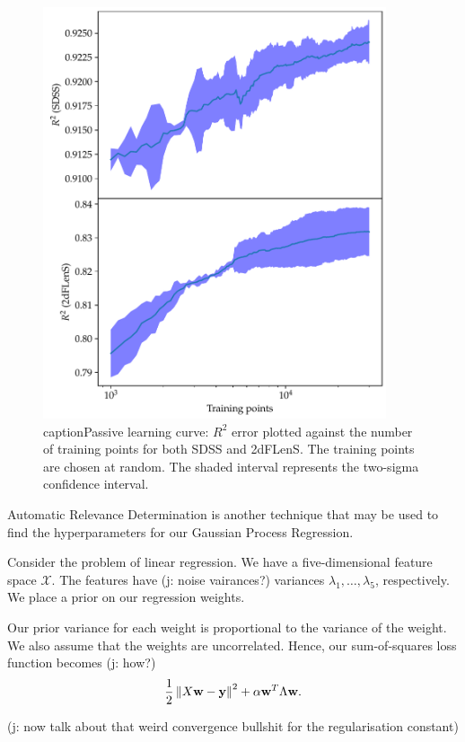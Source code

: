 \documentclass[11pt,twoside]{report}
\newcommand\bw{\mathbf{w}}
\newcommand\by{\mathbf{y}}
\newcommand\cX{\mathcal{X}}
\newcommand\norm[1]{\left\|#1\right\|}
\newcommand\jakub[1]{{\color{red}(j: #1)}}
\begin{document}
  \begin{figure}
    \centering
    \includegraphics[width=0.9\textwidth]{passive_r2.pdf}
    caption{Passive learning curve: $R^2$ error plotted against the number of training points for both SDSS and 2dFLenS. The training points are chosen at random. The shaded interval represents the two-sigma confidence interval.}
    \label{fig:passive_r2}
  \end{figure}

Automatic Relevance Determination is another technique that may be used to find the hyperparameters for our Gaussian Process Regression.

Consider the problem of linear regression. We have a five-dimensional feature space $\cX$. The features have \jakub{noise vairances?} variances $\lambda_1, \dots, \lambda_5$, respectively. We place a prior on our regression weights.

Our prior variance for each weight is proportional to the variance of the weight. We also assume that the weights are uncorrelated. Hence, our sum-of-squares loss function becomes \jakub{how?}\[
    \frac12\norm{X\bw - \by}^2 + \alpha \bw^T \Lambda \bw \text.
\]

\jakub{now talk about that weird convergence bullshit for the regularisation constant}
\end{document}
